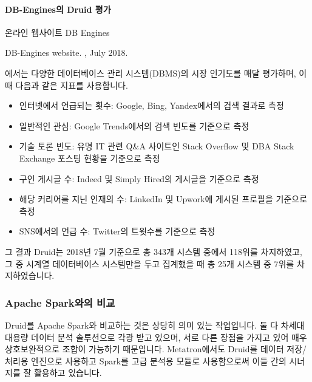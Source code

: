 \documentclass[letterpaper,10pt,english]{sphinxmanual}
\begin{document}
\paragraph{DB-Engines의 Druid 평가}
\label{\detokenize{discovery/part01/druid_tests:db-engines-druid}}
온라인 웹사이트 DB Engines%
\begin{footnote}[3]\sphinxAtStartFootnote
DB-Engines website. , July 2018.
%
\end{footnote}에서는 다양한 데이터베이스 관리 시스템(DBMS)의 시장 인기도를 매달 평가하며, 이때 다음과 같은 지표를 사용합니다.
\begin{itemize}
\item {} 
인터넷에서 언급되는 횟수: Google, Bing, Yandex에서의 검색 결과로 측정

\item {} 
일반적인 관심: Google Trends에서의 검색 빈도를 기준으로 측정

\item {} 
기술 토론 빈도: 유명 IT 관련 Q\&A 사이트인 Stack Overflow 및 DBA Stack Exchange 포스팅 현황을 기준으로 측정

\item {} 
구인 게시글 수: Indeed 및 Simply Hired의 게시글을 기준으로 측정

\item {} 
해당 커리어를 지닌 인재의 수: LinkedIn 및 Upwork에 게시된 프로필을 기준으로 측정

\item {} 
SNS에서의 언급 수: Twitter의 트윗수를 기준으로 측정

\end{itemize}

그 결과 Druid는 2018년 7월 기준으로 총 343개 시스템 중에서 118위를 차지하였고, 그 중 시계열 데이터베이스 시스템만을 두고 집계했을 때 총 25개 시스템 중 7위를 차지하였습니다.


\subsubsection{Apache Spark와의 비교}
\label{\detokenize{discovery/part01/druid_tests:apache-spark}}
Druid를 Apache Spark와 비교하는 것은 상당히 의미 있는 작업입니다. 둘 다 차세대 대용량 데이터 분석 솔루션으로 각광 받고 있으며, 서로 다른 장점을 가지고 있어 매우 상호보완적으로 조합이 가능하기 때문입니다. Metatron에서도 Druid를 데이터 저장/처리용 엔진으로 사용하고 Spark를 고급 분석용 모듈로 사용함으로써 이들 간의 시너지를 잘 활용하고 있습니다.
\end{document}
